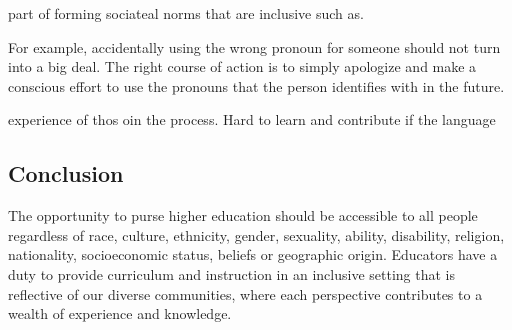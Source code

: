 \documentclass[11pt]{article}
\begin{document}
part of forming sociateal norms that are inclusive such as. 

For example, accidentally using the wrong pronoun for someone should not turn into a big deal. The right course of action is to simply apologize and make a conscious effort to use the pronouns that the person identifies with in the future. 

experience of thos oin the  process. Hard to learn and contribute if the language




\subsection*{Conclusion}

The opportunity to purse higher education should be accessible to all people regardless of race, culture, ethnicity, gender, sexuality, ability, disability, religion, nationality, socioeconomic status, beliefs or geographic origin. Educators have a duty to provide curriculum and instruction in an inclusive setting that is reflective of our diverse communities, where each perspective contributes to a wealth of experience and knowledge. %












 
\end{document}
